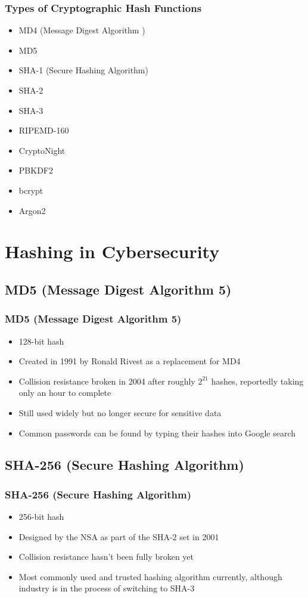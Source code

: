 \documentclass{beamer}
\begin{document}
\begin{frame}
\frametitle{Types of Cryptographic Hash Functions}
	\begin{itemize}
		\item MD4 (Message Digest Algorithm )
		\item MD5 
		\item SHA-1 (Secure Hashing Algorithm)
		\item SHA-2
		\item SHA-3 
		\item RIPEMD-160 
		\item CryptoNight
		\item PBKDF2
		\item bcrypt
		\item Argon2
	\end{itemize}
\end{frame}

\section{Hashing in Cybersecurity}

\subsection{MD5 (Message Digest Algorithm 5)}
\begin{frame}
\frametitle{MD5 (Message Digest Algorithm 5)}
	\begin{itemize}
		\item 128-bit hash
		\item Created in 1991 by Ronald Rivest as a replacement for MD4
		\item Collision resistance broken in 2004 after roughly $2^{21}$ hashes, reportedly taking only an hour to complete
		\item Still used widely but no longer secure for sensitive data
		\item Common passwords can be found by typing their hashes into Google search
	\end{itemize}
\end{frame}

\subsection{SHA-256 (Secure Hashing Algorithm)}
\begin{frame}
\frametitle{SHA-256 (Secure Hashing Algorithm)}
	\begin{itemize}
		\item 256-bit hash
		\item Designed by the NSA as part of the SHA-2 set in 2001
		\item Collision resistance hasn't been fully broken yet
		\item Most commonly used and trusted hashing algorithm currently, although industry is in the process of switching to SHA-3
	\end{itemize}
\end{frame}
\end{document}
